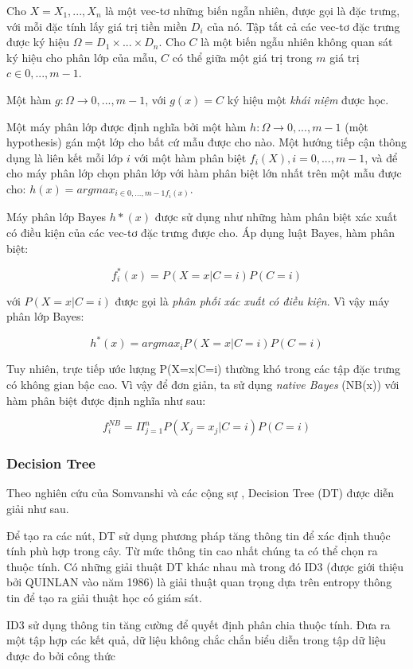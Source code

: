 Cho \( X = X_1, ..., X_n\) là một vec-tơ những biến ngẫn nhiên, được gọi là đặc trưng, với mỗi đặc tính lấy giá trị tiền miền $D_i$ của nó. Tập tất cả các vec-tơ đặc trưng được ký hiệu  \(\Omega = D_1 \times ... \times D_n\). Cho $C$ là một biến ngẫu nhiên không quan sát ký hiệu cho phân lớp của mẫu, $C$ có thể giữa một giá trị trong $m$ giá trị $c \in {0,...,m-1}$.

Một hàm \(g: \Omega \rightarrow {0,...,m-1}\), với $g(x) = C$ ký hiệu một \textit{khái niệm} được học. 

Một  máy phân lớp được định nghĩa bởi một hàm $h: \Omega \rightarrow {0,...,m-1}$ (một hypothesis) gán một lớp cho bất cứ mẫu được cho nào. Một hướng tiếp cận thông dụng là liên kết mỗi lớp $i$ với một hàm phân biệt \( f_i(X), i={0,...,m-1}\), và để cho máy phân lớp chọn phân lớp với hàm phân biệt lớn nhất trên một mẫu được cho: \(h(x)  = argmax_{i \in {0,...,m-1}f_i(x)}\).

Máy phân lớp Bayes $h*(x)$ được sử dụng như những hàm phân biệt xác xuất có điều kiện của các vec-tơ đặc trưng được cho. Áp dụng luật Bayes, hàm phân biệt: 

\[ f^{*}_i(x) = P(X=x|C=i)P(C=i)\] 

với $P(X=x|C=i)$ được gọi là \textit{phân phối xác xuất có điều kiện}. Vì vậy máy phân lớp Bayes:

\[ h^{*}(x)  = argmax_i P(X=x|C=i)P(C=i)\]

Tuy nhiên, trực tiếp ước lượng P(X=x|C=i) thường  khó trong các tập đặc trưng có không gian bậc cao. Vì vậy để đơn giản, ta sử dụng \textit{native Bayes} (NB(x)) với hàm phân biệt được định  nghĩa như sau:

\[ f^{NB}_i = \Pi^n_{j=1}P(X_j=x_j|C=i)P(C=i)\]

\subsubsection{Decision Tree}

Theo nghiên cứu của Somvanshi và các cộng sự \cite{72-Somvanshi}, Decision Tree (DT) được diễn giải như sau.

Để tạo ra các nút, DT sử dụng phương pháp tăng thông  tin để xác định thuộc tính phù hợp trong cây. Từ mức thông tin cao nhất  chúng ta có thể chọn ra thuộc tính.  Có những giải thuật  DT khác nhau  mà trong đó ID3 (được giới thiệu bởi QUINLAN vào năm 1986) là giải thuật quan trọng dựa trên entropy thông tin để tạo ra giải thuật học có giám sát.

ID3 sử dụng thông tin tăng cường để quyết định phân chia thuộc tính. Đưa ra một tập hợp các kết quả, dữ liệu không chắc chắn biểu diễn trong tập dữ liệu được đo bởi công thức 


